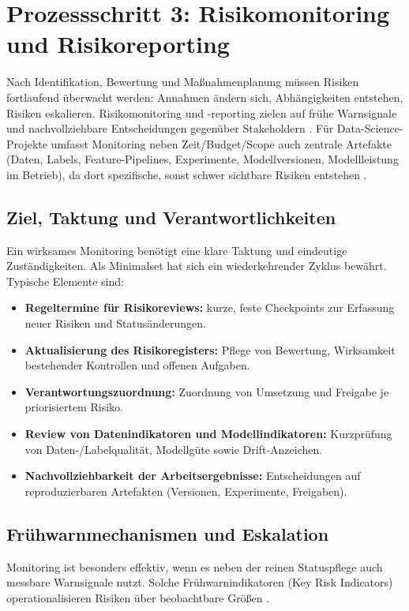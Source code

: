 \section{Prozessschritt 3: Risikomonitoring und Risikoreporting} \label{sec:risiko_monitoring}

Nach Identifikation, Bewertung und Maßnahmenplanung müssen Risiken fortlaufend
überwacht werden: Annahmen ändern sich, Abhängigkeiten entstehen, Risiken eskalieren.
Risikomonitoring und -reporting zielen auf frühe Warnsignale und nachvollziehbare
Entscheidungen gegenüber Stakeholdern \cite{Tiemeyer2023}.
Für Data-Science-Projekte umfasst Monitoring neben Zeit/Budget/Scope auch zentrale
Artefakte (Daten, Labels, Feature-Pipelines, Experimente, Modellversionen, Modellleistung im Betrieb),
da dort spezifische, sonst schwer sichtbare Risiken entstehen \cite{Sculley2015,Amershi2019}.

\subsection{Ziel, Taktung und Verantwortlichkeiten}
Ein wirksames Monitoring benötigt eine klare Taktung und eindeutige Zuständigkeiten.
Als Minimalset hat sich ein wiederkehrender Zyklus bewährt. Typische Elemente sind:
\begin{itemize}
	\item \textbf{Regeltermine für Risikoreviews:}
				kurze, feste Checkpoints zur Erfassung neuer Risiken und Statusänderungen.
	\item \textbf{Aktualisierung des Risikoregisters:}
				Pflege von Bewertung, Wirksamkeit bestehender Kontrollen und offenen Aufgaben.
	\item \textbf{Verantwortungszuordnung:}
				Zuordnung von Umsetzung und Freigabe je priorisiertem Risiko.
	\item \textbf{Review von Datenindikatoren und Modellindikatoren:}
				Kurzprüfung von Daten-/Labelqualität, Modellgüte sowie Drift-Anzeichen.
	\item \textbf{Nachvollziehbarkeit der Arbeitsergebnisse:}
				Entscheidungen auf reproduzierbaren Artefakten (Versionen, Experimente, Freigaben).
\end{itemize}

\subsection{Frühwarnmechanismen und Eskalation}
Monitoring ist besonders effektiv,
wenn es neben der reinen Statuspflege auch messbare Warnsignale nutzt.
Solche Frühwarnindikatoren (Key Risk Indicators) operationalisieren Risiken über
beobachtbare Größen \cite{Tiemeyer2023}.

